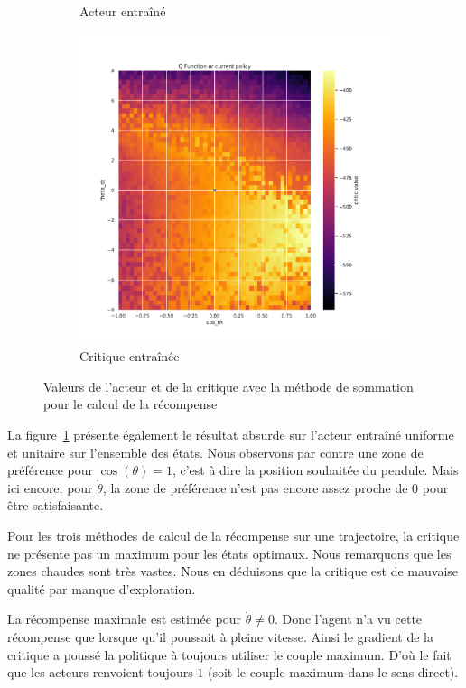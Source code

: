 \begin{figure}[H]
\begin{subfigure}{0.3\textwidth}
        \caption{Acteur entraîné}
    \end{subfigure}
    \begin{subfigure}{0.3\textwidth}
        \includegraphics[width=\textwidth]{figures/prelimaire/0_critic_sum_post_Pendulum-v0.pdf}
        \caption{Critique entraînée}
    \end{subfigure}
    \caption{Valeurs de l'acteur et de la critique avec la méthode de sommation pour le calcul de la récompense}
    \label{fig:preli_sum}
\end{figure}

La figure~\ref{fig:preli_sum} présente également le résultat absurde sur l'acteur entraîné uniforme et unitaire sur l'ensemble des états. Nous observons par contre une zone de préférence pour $\cos(\theta) = 1$, c'est à dire la position souhaitée du pendule. Mais ici encore, pour $\dot{\theta}$, la zone de préférence n'est pas encore assez proche de 0 pour être satisfaisante.

Pour les trois méthodes de calcul de la récompense sur une trajectoire, la critique ne présente pas un maximum pour les états optimaux. Nous remarquons que les zones chaudes sont très vastes. Nous en déduisons que la critique est de mauvaise qualité par manque d'exploration.

La récompense maximale est estimée pour $\dot{\theta} \not= 0$. Donc l'agent n'a vu cette récompense que lorsque qu'il poussait à pleine vitesse. Ainsi le gradient de la critique a poussé la politique à toujours utiliser le couple maximum. D'où le fait que les acteurs renvoient toujours $1$ (soit le couple maximum dans le sens direct).